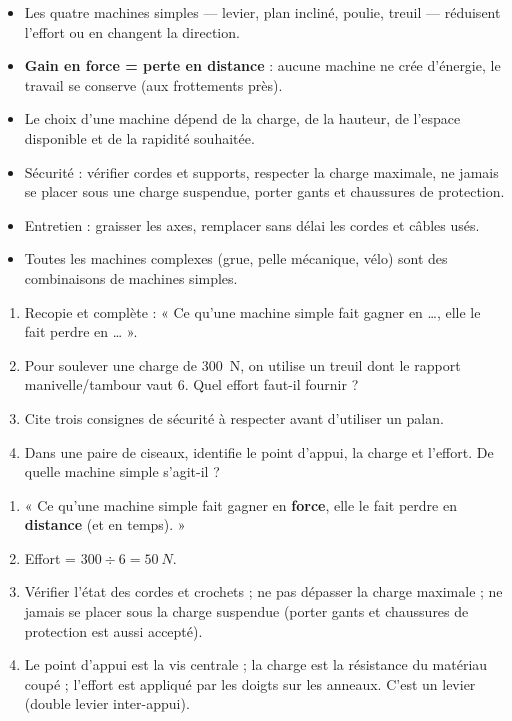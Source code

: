 \documentclass[11pt]{article}
\newcommand{\cle}[1]{{\popxbold\color{popdark}#1}}
\begin{document}
\begin{aretenir}
\begin{itemize}
\item Les quatre machines simples — \cle{levier}, \cle{plan incliné}, \cle{poulie}, \cle{treuil} — réduisent l'effort ou en changent la direction.
\item \textbf{Gain en force = perte en distance} : aucune machine ne crée d'énergie, le travail se conserve (aux frottements près).
\item Le choix d'une machine dépend de la charge, de la hauteur, de l'espace disponible et de la rapidité souhaitée.
\item Sécurité : vérifier cordes et supports, respecter la charge maximale, ne jamais se placer sous une charge suspendue, porter gants et chaussures de protection.
\item Entretien : graisser les axes, remplacer sans délai les cordes et câbles usés.
\item Toutes les machines complexes (grue, pelle mécanique, vélo) sont des combinaisons de machines simples.
\end{itemize}
\end{aretenir}

\begin{exercice}
\begin{enumerate}
\item Recopie et complète : « Ce qu'une machine simple fait gagner en \ldots{}, elle le fait perdre en \ldots{} ».
\item Pour soulever une charge de \SI{300}{N}, on utilise un treuil dont le rapport manivelle/tambour vaut 6. Quel effort faut-il fournir ?
\item Cite trois consignes de sécurité à respecter avant d'utiliser un palan.
\item Dans une paire de ciseaux, identifie le point d'appui, la charge et l'effort. De quelle machine simple s'agit-il ?
\end{enumerate}
\end{exercice}

\begin{corrige}[Exercice n°1]
\begin{enumerate}
\item « Ce qu'une machine simple fait gagner en \textbf{force}, elle le fait perdre en \textbf{distance} (et en temps). »
\item Effort = $300 \div 6 = \SI{50}{N}$.
\item Vérifier l'état des cordes et crochets ; ne pas dépasser la charge maximale ; ne jamais se placer sous la charge suspendue (porter gants et chaussures de protection est aussi accepté).
\item Le point d'appui est la vis centrale ; la charge est la résistance du matériau coupé ; l'effort est appliqué par les doigts sur les anneaux. C'est un \cle{levier} (double levier inter-appui).
\end{enumerate}
\end{corrige}
\end{document}
